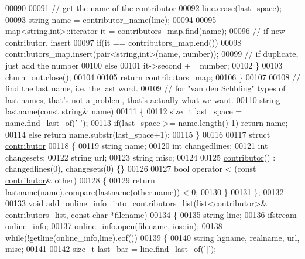 \begin{DoxyCode}
00090 
00091     \textcolor{comment}{// get the name of the contributor}
00092     line.erase(last\_space);    
00093     \textcolor{keywordtype}{string} name = contributor\_name(line);
00094     
00095     map<string,int>::iterator it = contributors\_map.find(name);
00096     \textcolor{comment}{// if new contributor, insert}
00097     \textcolor{keywordflow}{if}(it == contributors\_map.end())
00098       contributors\_map.insert(pair<string,int>(name, number));
00099     \textcolor{comment}{// if duplicate, just add the number}
00100     \textcolor{keywordflow}{else}
00101       it->second += number;
00102   \}
00103   churn\_out.close();
00104 
00105   \textcolor{keywordflow}{return} contributors\_map;
00106 \}
00107 
00108 \textcolor{comment}{// find the last name, i.e. the last word.}
00109 \textcolor{comment}{// for "van den Schbling" types of last names, that's not a problem, that's actually what we want.}
00110 \textcolor{keywordtype}{string} lastname(\textcolor{keyword}{const} \textcolor{keywordtype}{string}& name)
00111 \{
00112   \textcolor{keywordtype}{size\_t} last\_space = name.find\_last\_of(\textcolor{charliteral}{' '});
00113   \textcolor{keywordflow}{if}(last\_space >= name.length()-1) \textcolor{keywordflow}{return} name;
00114   \textcolor{keywordflow}{else} \textcolor{keywordflow}{return} name.substr(last\_space+1);
00115 \}
00116 
00117 \textcolor{keyword}{struct }\hyperlink{structcontributor}{contributor}
00118 \{
00119   \textcolor{keywordtype}{string} name;
00120   \textcolor{keywordtype}{int} changedlines;
00121   \textcolor{keywordtype}{int} changesets;
00122   \textcolor{keywordtype}{string} url;
00123   \textcolor{keywordtype}{string} misc;
00124   
00125   \hyperlink{structcontributor}{contributor}() : changedlines(0), changesets(0) \{\}
00126   
00127   \textcolor{keywordtype}{bool} operator < (\textcolor{keyword}{const} \hyperlink{structcontributor}{contributor}& other)
00128   \{
00129     \textcolor{keywordflow}{return} lastname(name).compare(lastname(other.name)) < 0;
00130   \}
00131 \};
00132 
00133 \textcolor{keywordtype}{void} add\_online\_info\_into\_contributors\_list(list<contributor>& contributors\_list, \textcolor{keyword}{const} \textcolor{keywordtype}{char} *filename)
00134 \{
00135   \textcolor{keywordtype}{string} line;
00136   ifstream online\_info;
00137   online\_info.open(filename, ios::in);
00138   \textcolor{keywordflow}{while}(!getline(online\_info,line).eof())
00139   \{
00140     \textcolor{keywordtype}{string} hgname, realname, url, misc;
00141     
00142     \textcolor{keywordtype}{size\_t} last\_bar = line.find\_last\_of(\textcolor{charliteral}{'|'});

\end{DoxyCode}
